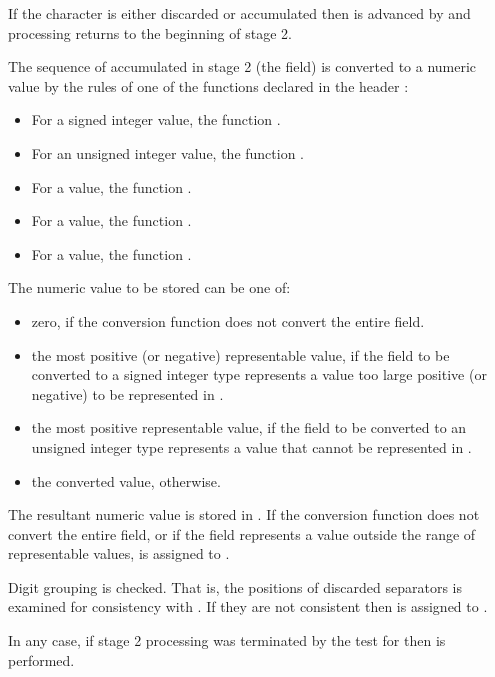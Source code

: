 \begin{itemdescr}
\begin{description}
If the character is either discarded or accumulated
then  is advanced by 
and processing returns to the beginning of stage 2.

The sequence of  accumulated in stage 2 (the field)
is converted to a numeric value by the rules of one of the functions
declared in the header :
\begin{itemize}
\item
For a signed integer value, the function .
\item
For an unsigned integer value, the function .
\item
For a  value, the function .
\item
For a  value, the function .
\item
For a  value, the function .
\end{itemize}

The numeric value to be stored can be one of:
\begin{itemize}
\item
zero, if the conversion function does not convert the entire field.
\item
the most positive (or negative) representable value,
if the field to be converted to a signed integer type represents a value
too large positive (or negative) to be represented in .
\item
the most positive representable value,
if the field to be converted to an unsigned integer type represents a value
that cannot be represented in .
\item
the converted value, otherwise.
\end{itemize}

The resultant numeric value is stored in .
If the conversion function does not convert the entire field, or
if the field represents a value outside the range of representable values,
 is assigned to .
\end{description}

\pnum
Digit grouping is checked.
That is, the positions of discarded
separators is examined for consistency with
.
If they are not consistent
then  is assigned to .

\pnum
In any case,
if stage 2 processing was terminated by the test for 
then  is performed.
\end{itemdescr}

